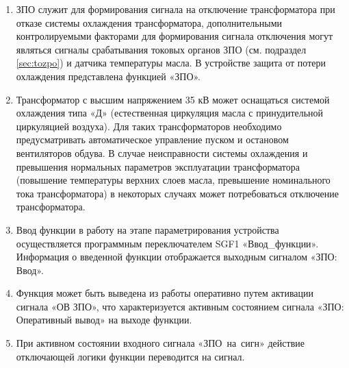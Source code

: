 
\color{black}

\begin{enumerate}

\item
ЗПО служит для формирования сигнала на отключение трансформатора при отказе системы охлаждения трансформатора, дополнительными контролируемыми факторами для формирования сигнала отключения могут являться сигналы срабатывания токовых органов ЗПО (см. подраздел \ref{sec:tozpo}) и датчика температуры масла. В устройстве защита от потери охлаждения представлена функцией «ЗПО».

\item
Трансформатор с высшим напряжением 35 кВ может оснащаться системой охлаждения типа «Д» (естественная циркуляция масла с принудительной циркуляцией воздуха). Для таких трансформаторов необходимо предусматривать автоматическое управление пуском и остановом вентиляторов обдува. В случае неисправности системы охлаждения и превышения нормальных параметров эксплуатации трансформатора (повышение температуры верхних слоев масла, превышение номинального тока трансформатора) в некоторых случаях может потребоваться отключение трансформатора. 

\item
Ввод функции в работу на этапе параметрирования устройства осуществляется программным переключателем SGF1 «Ввод\_функции». Информация о введенной функции отображается выходным сигналом «ЗПО: Ввод». 

\item
Функция может быть выведена из работы оперативно путем активации сигнала «ОВ ЗПО», что характеризуется активным состоянием сигнала «ЗПО: Оперативный вывод» на выходе функции. 

\item
При активном состоянии входного сигнала «ЗПО~на~сигн» действие отключающей логики функции переводится на сигнал.


\end{enumerate}
